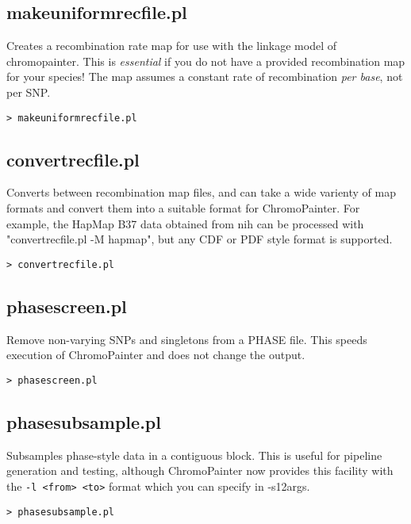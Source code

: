\documentclass[11pt]{article}
\begin{document}
\subsection{makeuniformrecfile.pl}
Creates a recombination rate map for use with the linkage model of chromopainter. This is \emph{essential} if you do not have a provided recombination map for your species! The map assumes a constant rate of recombination \emph{per base}, not per SNP.
\begin{lstlisting}[caption=makeuniformrecfile]
> makeuniformrecfile.pl
\end{lstlisting}


\subsection{convertrecfile.pl}
Converts between recombination map files, and can take a wide varienty of map formats and convert them into a suitable format for ChromoPainter. For example, the HapMap B37 data obtained from nih can be processed with "convertrecfile.pl -M hapmap", but any CDF or PDF style format is supported.
\begin{lstlisting}[caption=convertrecfile]
> convertrecfile.pl
\end{lstlisting}


\subsection{phasescreen.pl}
Remove non-varying SNPs and singletons from a PHASE file. This speeds execution of ChromoPainter and does not change the output.
\begin{lstlisting}[caption=phasescreen]
> phasescreen.pl
\end{lstlisting}


\subsection{phasesubsample.pl}
Subsamples phase-style data in a contiguous block. This is useful for pipeline generation and testing, although ChromoPainter now provides this facility with the \verb!-l <from> <to>! format which you can specify in -s12args.
\begin{lstlisting}[caption=phasesubsample]
> phasesubsample.pl
\end{lstlisting}

\end{document}

